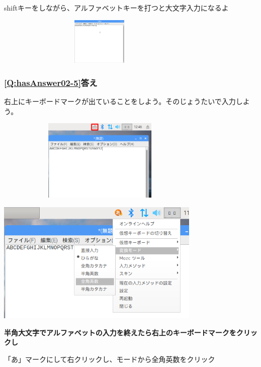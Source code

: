 \documentclass[a4paper,12pt]{jarticle}
\begin{document}
shiftキーをしながら、アルファベットキーを打つと大文字入力になるよ


\centering
\includegraphics[width=10.031cm,height=2.27cm]{textbook-img217.png}
\flushleft

\clearpage\subsubsection{\bfseries
\ref*{Q:hasAnswer02-5}答え}

右上にキーボードマークが出ていることをしよう。そのじょうたいで入力しよう。


\bigskip


\centering
\includegraphics[width=10.075cm,height=3.914cm]{textbook-img218.png}
\flushleft


\bigskip





\centering
\includegraphics[width=9.733cm,height=5.851cm]{textbook-img219.png}
\flushleft


\bigskip

{\bfseries
  半角大文字でアルファベットの入力を終えたら右上のキーボードマークをクリックし

  「あ」マークにして右クリックし、モードから全角英数をクリック}
\end{document}
